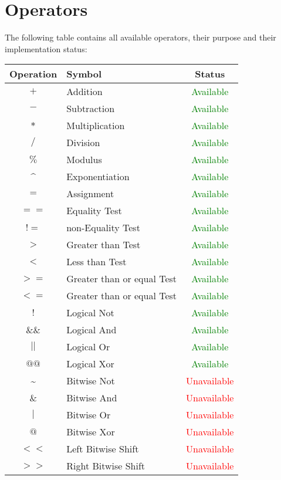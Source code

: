 \documentclass{standalone}
\begin{document}
	\section{Operators}
		The following table contains all available operators, their purpose and their implementation status:\\
		\begin{tabular}{| c | l | c |}
			\hline
			Operation & Symbol & Status\\
			\hline
			$+$ & Addition & \textcolor{green}{Available} \\
			\hline
			$-$ & Subtraction & \textcolor{green}{Available} \\
			\hline
			$*$ & Multiplication & \textcolor{green}{Available} \\
			\hline
			$/$ & Division & \textcolor{green}{Available} \\
			\hline
			$\%$ & Modulus & \textcolor{green}{Available} \\
			\hline
			\^{} & Exponentiation & \textcolor{green}{Available} \\
			\hline
			$=$ & Assignment & \textcolor{green}{Available} \\
			\hline
			$==$ & Equality Test & \textcolor{green}{Available} \\
			\hline
			$!=$ & non-Equality Test & \textcolor{green}{Available} \\
			\hline
			$>$ & Greater than Test & \textcolor{green}{Available} \\
			\hline
			$<$ & Less than Test & \textcolor{green}{Available} \\
			\hline
			$>=$ & Greater than or equal Test & \textcolor{green}{Available} \\
			\hline
			$<=$ & Greater than or equal Test & \textcolor{green}{Available} \\
			\hline
			$!$ & Logical Not & \textcolor{green}{Available} \\
			\hline
			$\&\&$ & Logical And & \textcolor{green}{Available} \\
			\hline
			$||$ & Logical Or & \textcolor{green}{Available} \\
			\hline
			$@@$ & Logical Xor & \textcolor{green}{Available} \\
			\hline
			\~{} & Bitwise Not & \textcolor{red}{Unavailable} \\
			\hline
			$\&$ & Bitwise And & \textcolor{red}{Unavailable} \\
			\hline
			$|$ & Bitwise Or & \textcolor{red}{Unavailable} \\
			\hline
			$@$ & Bitwise Xor & \textcolor{red}{Unavailable} \\
			\hline
			$<<$ & Left Bitwise Shift & \textcolor{red}{Unavailable} \\
			\hline
			$>>$ & Right Bitwise Shift & \textcolor{red}{Unavailable} \\
			\hline
		\end{tabular}
\end{document}

